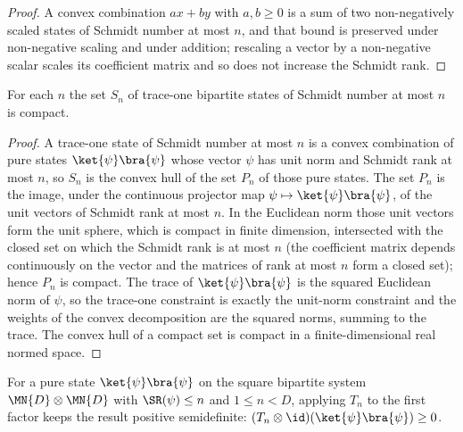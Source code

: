 \begin{proof}
    \leanok
    A convex combination $a x + b y$ with $a,b\ge 0$ is a sum of two non-negatively
    scaled states of Schmidt number at most $n$, and that bound is preserved under
    non-negative scaling and under addition; rescaling a vector by a non-negative
    scalar scales its coefficient matrix and so does not increase the Schmidt rank.
\end{proof}

\begin{theorem}
    \label{thm:compact_setOf_has_schmidt_number_le_trace_one}
    \leanok
    For each $n$ the set $S_n$ of trace-one bipartite states of Schmidt number at most
    $n$ is compact.
\end{theorem}

\begin{proof}
    \leanok
    A trace-one state of Schmidt number at most $n$ is a convex combination of pure
    states $\ket{\psi}\bra{\psi}$ whose vector $\psi$ has unit norm and Schmidt rank
    at most $n$, so $S_n$ is the convex hull of the set $P_n$ of those pure states.
    The set $P_n$ is the image, under the continuous projector map
    $\psi\mapsto\ket{\psi}\bra{\psi}$, of the unit vectors of Schmidt rank at most
    $n$. In the Euclidean norm those unit vectors form the unit sphere, which is
    compact in finite dimension, intersected with the closed set on which the Schmidt
    rank is at most $n$ (the coefficient matrix depends continuously on the vector and
    the matrices of rank at most $n$ form a closed set); hence $P_n$ is compact. The
    trace of $\ket{\psi}\bra{\psi}$ is the squared Euclidean norm of $\psi$, so the
    trace-one constraint is exactly the unit-norm constraint and the weights of the
    convex decomposition are the squared norms, summing to the trace. The convex hull
    of a compact set is compact in a finite-dimensional real normed space.
\end{proof}

\begin{theorem}
    \label{thm:tensor_map_id_t_eta_posSemidef_pure}
    \leanok
    For a pure state $\ket{\psi}\bra{\psi}$ on the square bipartite system
    $\MN{D}\otimes\MN{D}$ with $\SR(\psi)\le n$ and
    $1\le n<D$, applying $T_n$ to the first factor keeps the result positive
    semidefinite: $(T_n\otimes\id)(\ket{\psi}\bra{\psi})\ge 0$.
\end{theorem}

